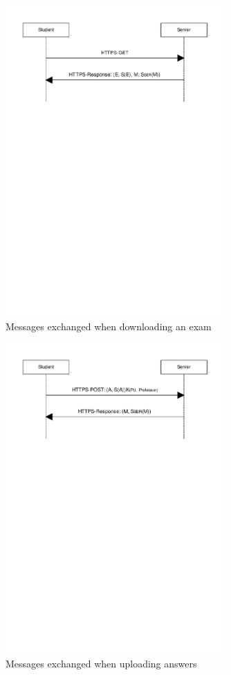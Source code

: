 \documentclass{article}
\begin{document}
\begin{figure}
\begin{center}
\includegraphics[width=0.75\textwidth]{images/download_exam.pdf}
\caption{Messages exchanged when downloading an exam}
\label{fig:download-exam}
\end{center}
\end{figure}

\begin{figure}
\begin{center}
\includegraphics[width=0.75\textwidth]{images/upload_answers.pdf}
\caption{Messages exchanged when uploading answers}
\label{fig:upload-answers}
\end{center}
\end{figure}
\end{document}
